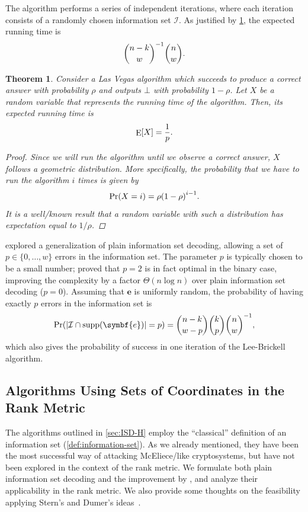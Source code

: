 \documentclass[version=last, paper=A4, parskip=half, oneside,%
toc=bibliography, toc=listof, listof=leveldown]{scrbook}
\theoremstyle{plain}
\newtheorem{theorem}{Theorem}
\theoremstyle{definition}
\theoremstyle{remark}
\renewcommand*{\vec}{\symbf}
\DeclareMathOperator{\supp}{supp}
\DeclareMathOperator{\E}{E}
\DeclarePairedDelimiter{\card}{\lvert}{\rvert}
\begin{document}
The algorithm performs a series of independent iterations, where each iteration
consists of a randomly chosen information set \(\mathcal{I}\).  As justified by
\cref{thm:las-vegas-running-time}, the expected running time is
\[
  \binom{n - k}{w}^{-1}\binom{n}{w}\text.
\]

\begin{theorem}\label{thm:las-vegas-running-time}
  Consider a Las Vegas algorithm which succeeds to produce a correct answer with
  probability \(\rho\) and outputs \(\bot\) with probability \(1 - \rho\).  Let
  \(X\) be a random variable that represents the running time of the algorithm.
  Then, its expected running time is
  \[
    \E[X] = \frac{1}{p}\text.
  \]
  \begin{proof}
    Since we will run the algorithm until we observe a correct answer, \(X\)
    follows a geometric distribution.  More specifically, the probability that
    we have to run the algorithm \(i\) times is given by
    \[
      \Pr(X = i) = \rho {(1 - \rho)}^{i - 1}\text.
    \]
    It is a well\-/known result that a random variable with such a distribution
    has expectation equal to \(1 / {\rho}\).
  \end{proof}
\end{theorem}

\Textcite{LB88} explored a generalization of plain information set decoding,
allowing a set of \(p \in \{0, \ldots, w\}\) errors in the information set.
The parameter \(p\) is typically chosen to be a small number; \textcite{Pet11}
proved that \(p = 2\) is in fact optimal in the binary case, improving the
complexity by a factor \(\Theta(n \log n)\) over plain information set decoding
(\(p = 0\)).  Assuming that \(\vec{e}\) is uniformly random, the probability of
having exactly \(p\) errors in the information set is
\[
  \Pr(\card{\mathcal{I} \cap \supp(\vec{e})} = p) =
  \binom{n - k}{w - p}\binom{k}{p}\binom{n}{w}^{-1}\text,
\]
which also gives the probability of success in one iteration of the
Lee\--Brickell algorithm.

\subsection{Algorithms Using Sets of Coordinates in the Rank
  Metric}\label{sec:ISD-R-SC}

The algorithms outlined in \cref{sec:ISD-H} employ the \enquote{classical}
definition of an information set (\cref{def:information-set}).  As we already
mentioned, they have been the most successful way of attacking McEliece\-/like
cryptosystems, but have not been explored in the context of the rank metric.  We
formulate both plain information set decoding and the improvement by
\textcite{LB88}, and analyze their applicability in the rank metric.  We also
provide some thoughts on the feasibility applying Stern's and Dumer's
ideas~\cite{Ste89, Dum96}.
\end{document}
